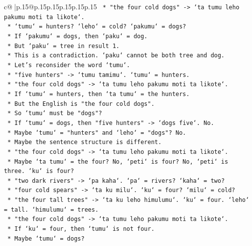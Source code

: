 \documentclass{article}
\begin{document}
{\begin{supertabular}{c@{$\;$}|p{.15\linewidth}@{}p{.15\linewidth}p{.15\linewidth}p{.15\linewidth}p{.15\linewidth}p{.15\linewidth}}
{{{\texttt{            *   "the four cold dogs" {-}> `ta tumu leho pakumu moti ta likote`.} \\
\texttt{            *   `tumu` = hunters? `leho` = cold? `pakumu` = dogs?} \\
\texttt{            *   If `pakumu` = dogs, then `paku` = dog.} \\
\texttt{            *   But `paku` = tree in result 1.} \\
\texttt{            *   This is a contradiction. `paku` cannot be both tree and dog.} \\
\texttt{            *   Let's reconsider the word `tumu`.} \\
\texttt{            *   "five hunters" {-}> `tumu tamimu`. `tumu` = hunters.} \\
\texttt{            *   "the four cold dogs" {-}> `ta tumu leho pakumu moti ta likote`.} \\
\texttt{            *   If `tumu` = hunters, then `ta tumu` = the hunters.} \\
\texttt{            *   But the English is "the four cold dogs".} \\
\texttt{            *   So `tumu` must be "dogs"?} \\
\texttt{            *   If `tumu` = dogs, then "five hunters" {-}> `dogs five`. No.} \\
\texttt{            *   Maybe `tumu` = "hunters" and `leho` = "dogs"? No.} \\
\texttt{            *   Maybe the sentence structure is different.} \\
\texttt{            *   "the four cold dogs" {-}> `ta tumu leho pakumu moti ta likote`.} \\
\texttt{            *   Maybe `ta tumu` = the four? No, `peti` is four? No, `peti` is three. `ku` is four?} \\
\texttt{            *   "two dark rivers" {-}> `pa kaha`. `pa` = rivers? `kaha` = two?} \\
\texttt{            *   "four cold spears" {-}> `ta ku milu`. `ku` = four? `milu` = cold?} \\
\texttt{            *   "the four tall trees" {-}> `ta ku leho himulumu`. `ku` = four. `leho` = tall. `himulumu` = trees.} \\
\texttt{            *   "the four cold dogs" {-}> `ta tumu leho pakumu moti ta likote`.} \\
\texttt{            *   If `ku` = four, then `tumu` is not four.} \\
\texttt{            *   Maybe `tumu` = dogs?} \\
}}}
\end{supertabular}}
\end{document}
